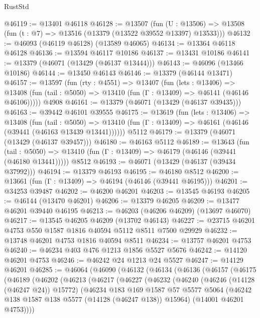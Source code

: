 \begin{lexlean}{RustStd}
\begin{coremodule}
@46119 := @13401 @46118
@46128 := @13507
    (fun (U : @13506) => @13508 (fun (t : @7) => @13516 (@13379 (@13522 @39552 @13397) @13533)))
@46132 := @46093 (@46119 @46128) (@13589 @46065)
@46134 := @13364 @46118 @46128
@46136 := @13594 @46117 @10186
@46137 := @13431 @10186
@46141 := @13379 (@46071 (@13429 (@46137 @13444)))
@46143 := @46096 (@13466 @10186)
@46144 := @13450 @46143
@46146 := @13379 (@46144 @13471)
@46157 := @13597
    (fun (rty : @4551) =>
    @13407
      (fun (lets : @13406) =>
      @13408 (fun (tail : @5050) => @13410 (fun (Γ : @13409) => @46141 (@46146 @46106)))))
    @4908
@46161 := @13379 (@46071 (@13429 (@46137 @39435)))
@46163 := @39442 @46101 @39555
@46175 := @13619
    (fun (lets : @13406) =>
    @13408
      (fun (tail : @5050) =>
      @13410 (fun (Γ : @13409) => @46161 (@46146 (@39441 (@46163 @13439 @13441))))))
    @5112
@46179 := @13379 (@46071 (@13429 (@46137 @39457)))
@46180 := @46163 @5112
@46189 := @13643
    (fun (tail : @5050) => @13410 (fun (Γ : @13409) => @46179 (@46146 (@39441 (@46180 @13441)))))
    @8512
@46193 := @46071 (@13429 (@46137 (@39434 @37992)))
@46194 := @13379 @46193
@46195 := @46180 @8512
@46200 := @13661 (fun (Γ : @13409) => @46194 (@46146 (@39441 @46195)))
@46201 := @34253 @39487
@46202 := @46200 @46201
@46203 := @13545 @46193
@46205 := @46144 (@13470 @46201)
@46206 := @13379 @46205
@46209 := @13477 @46201 @39440 @46195
@46213 := @46203 (@46206 @46209) (@13697 @46070)
@46217 := @13545 @46205 @46209 (@13702 @46143)
@46227 := @23715 @46201 @4753 @550 @1587 @1816 @40594 @5112 @8511 @7500 @29929
@46232 := @13748 @46201 @4753 @1816 @40594 @8511
@46234 := @13757 @46201 @4753
@46240 := @46234 @403 @476 @1213 @1856 @5527 @5676
@46242 := @14120 @46201 @4753
@46246 := @46242 @24 @1213 @24 @5527
@46247 := @14129 @46201
@46285 := @46064
    (@46090
      (@46132
        (@46134
          (@46136
            (@46157
              (@46175
                (@46189
                  (@46202
                    (@46213
                      (@46217
                        (@46227
                          (@46232
                            (@46240
                              (@46246 (@14128 (@46247 @24)) @15772)
                              (@46234
                                @183
                                @169
                                @1587
                                @57
                                @5577
                                @5064
                                (@46242 @138 @1587 @138 @5577 (@14128 (@46247 @138)) @15964)
                                (@14001 @46201 @4753))))

\end{coremodule}
\end{lexlean}
